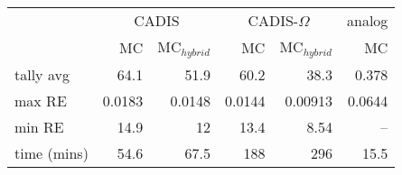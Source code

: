 \begin{tabular}{lrrrrr}
\toprule
{} & \multicolumn{2}{c}{CADIS}   & \multicolumn{2}{c}{CADIS-$\Omega$}  & analog \\
{} &    MC & MC$_{hybrid}$ &         MC & MC$_{hybrid}$ &     MC \\
\midrule
tally avg   &   64.1 &        51.9 &       60.2 &        38.3 &  0.378 \\
max RE      & 0.0183 &      0.0148 &     0.0144 &     0.00913 & 0.0644 \\
min RE      &   14.9 &          12 &       13.4 &        8.54 &    -- \\
time (mins) &   54.6 &        67.5 &        188 &         296 &   15.5 \\
\bottomrule
\end{tabular}
